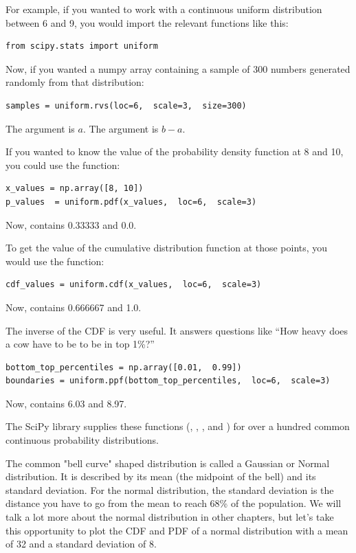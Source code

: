 For example,  if you wanted to work with a continuous uniform distribution between 6 and 9,  you would import the relevant
functions like this:

\begin{verbatim}
from scipy.stats import uniform
\end{verbatim}

Now, if you wanted a numpy array containing a sample of 300 numbers generated randomly from that distribution:

\begin{verbatim}
samples = uniform.rvs(loc=6,  scale=3,  size=300)
\end{verbatim}

The  argument is $a$. The  argument is $b - a$.

If you wanted to know the value of the probability density function at 8 and 10, you could use the  function:

\begin{verbatim}
x_values = np.array([8, 10])
p_values  = uniform.pdf(x_values,  loc=6,  scale=3)
\end{verbatim}

Now,  contains 0.33333 and 0.0.

To get the value of the cumulative distribution function at those points,  you would use the  function:

\begin{verbatim}
cdf_values = uniform.cdf(x_values,  loc=6,  scale=3)
\end{verbatim}

Now,  contains 0.666667 and 1.0.

The inverse of the CDF is very useful.  It answers questions like ``How heavy does a cow have to be to be in top 1\%?''

\begin{verbatim}
bottom_top_percentiles = np.array([0.01,  0.99])
boundaries = uniform.ppf(bottom_top_percentiles,  loc=6,  scale=3)
\end{verbatim}

Now,  contains 6.03 and 8.97.

The SciPy library supplies these functions (, ,  , and ) for over a hundred 
common continuous probability distributions.  

The common "bell curve" shaped distribution is called a Gaussian  or Normal distribution. It is described by its mean (the midpoint of the bell) and its standard deviation.  For the normal distribution,  the standard deviation is the distance you have to go from the mean to reach 68\% of the population. 
We will talk a lot more about the normal distribution in other chapters,  but let's take this opportunity to plot the CDF and PDF of a normal distribution with a mean of 32 and a standard deviation of 8.

